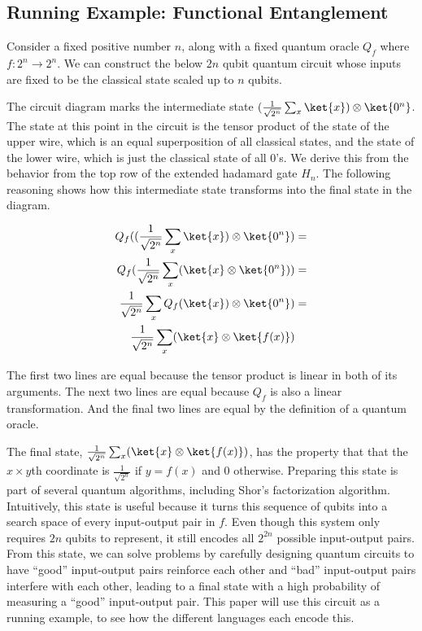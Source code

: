 \subsection{Running Example: Functional Entanglement}
Consider a fixed positive number $n$, along with a fixed quantum oracle $Q_f$ where $f : 2 ^ n \rightarrow 2 ^ n$. We can construct the below $2n$ qubit quantum circuit whose inputs are fixed to be the classical state  scaled up to $n$ qubits.



The circuit diagram marks the intermediate state $(\frac{1}{\sqrt{2^n}}\sum_x\ket{x})\otimes\ket{0^n}$.
The state at this point in the circuit is the tensor product of the state of the upper wire, which is an equal superposition of all classical states, and the state of the lower wire, which is just the classical state of all 0’s.
We derive this from the behavior from the top row of the extended hadamard gate $H_n$.
The following reasoning shows how this intermediate state transforms into the final state in the diagram.

\begin{align}
Q_f ((\frac{1}{\sqrt{2^n}}\sum_x\ket{x})\otimes\ket{0^n}) &=\\
Q_f(\frac{1}{\sqrt{2^n}}\sum_x(\ket{x}\otimes\ket{0^n})) &=\\
\frac{1}{\sqrt{2^n}}\sum_xQ_f(\ket{x})\otimes\ket{0^n}) &=\\
\frac{1}{\sqrt{2^n}}\sum_x (\ket{x} \otimes\ket{f(x)})
\end{align}

The first two lines are equal because the tensor product is linear in both of its arguments.
The next two lines are equal because $Q_f$ is also a linear transformation.
And the final two lines are equal by the definition of a quantum oracle.

The final state, $\frac{1}{\sqrt{2^n}}\sum_x (\ket{x} \otimes\ket{f(x)})$, has the property that that the $x \times y$th coordinate is $\frac{1}{\sqrt{2^n}}$ if $y = f(x)$ and $0$ otherwise.
Preparing this state is part of several quantum algorithms, including Shor’s factorization algorithm.
Intuitively, this state is useful because it turns this sequence of qubits into a search space of every input-output pair in $f$.
Even though this system only requires $2n$ qubits to represent, it still encodes all $2^{2n}$ possible input-output pairs.
From this state, we can solve problems by carefully designing quantum circuits to have “good” input-output pairs reinforce each other and “bad” input-output pairs interfere with each other, leading to a final state with a high probability of measuring a “good” input-output pair.
This paper will use this circuit as a running example, to see how the different languages each encode this. 

